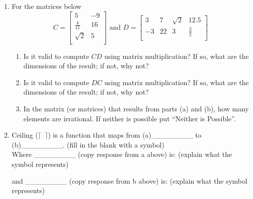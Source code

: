 \documentclass[11pt, oneside]{article}   	%
\begin{document}
\begin{enumerate}
\clearpage
\item For the matrices below
\[
C = \left[\begin{matrix}
5 & -9 \\
\frac{4}{11} & 16\\
\sqrt{2} & 5\\
\end{matrix}\right] \text{ and }
D = \left[\begin{matrix}
3 & 7 & \sqrt{2} & 12.5\\
-3 & 22 & 3 & \frac{3}{2}\\
\end{matrix}\right]
\]
\begin{enumerate}
\item Is it valid to compute $CD$ using matrix multiplication? If so, what are the dimensions of the result; if not, why not? 
\vspace{3em}
\item Is it valid to compute $DC$ using matrix multiplication? If so, what are the dimensions of the result; if not, why not? 
\vspace{3em}
\item In the matrix (or matrices) that results from parts (a) and (b), how many elements are irrational. If neither is possible put ``Neither is Possible''. 
\vspace{3em}
\end{enumerate}

\item Ceiling ($\lceil \;\;\rceil$) is a function that maps from (a)\_\_\_\_\_\_\_\_ to  (b)\_\_\_\_\_\_\_\_. (fill in the blank with a symbol)\\

Where \_\_\_\_\_\_\_\_  (copy response from a above) is: (explain what the symbol represents)\\
\vspace{4em}

and \_\_\_\_\_\_\_\_  (copy response from b above) is: (explain what the symbol represents)

\vspace{4em}

\end{enumerate}
\end{document}
